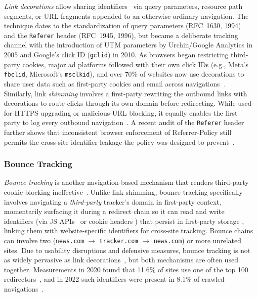 \textit{Link decorations} allow sharing identifiers \symSharing\ via query parameters, resource path segments, or URL fragments appended to an otherwise ordinary navigation.
%
The technique dates to the standardization of query parameters (RFC~1630, 1994) and the \texttt{Referer} header (RFC~1945, 1996), but became a deliberate tracking channel with the introduction of UTM parameters by Urchin/Google Analytics in 2005 and Google's click ID (\texttt{gclid}) in 2010.
%
As browsers began restricting third-party cookies, major ad platforms followed with their own click IDs (e.g., Meta's \texttt{fbclid}, Microsoft's \texttt{msclkid}), and over 70\% of websites now use decorations to share user data such as first-party cookies and email across navigations~\cite{munirPURLSafeEffective2024,koopInDepthEvaluationRedirect2020}.
%
Similarly, link \textit{shimming} involves a first-party rewriting the outbound links with decorations to route clicks through its own domain before redirecting.
%
While used for HTTPS upgrading or malicious-URL blocking, it equally enables the first party to log every outbound navigation~\cite{liShimShimmenyEvaluating2020}.
%
A recent audit of the \texttt{Referer} header further shows that inconsistent browser enforcement of Referrer-Policy still permits the cross-site identifier leakage the policy was designed to prevent~\cite{zagiReferrerPolicyImplementation2025}.


\subsubsection{Bounce Tracking}
\label{sec:stateful-techniques-bounce-tracking}

\textit{Bounce tracking} is another navigation-based mechanism that renders third-party cookie blocking ineffective~\cite{kellyBounceTrackingMitigations2022}.
%
Unlike link shimming, 
bounce tracking specifically involves navigating a \emph{third-party} tracker's domain in first-party context, momentarily surfacing it during a redirect chain so it can read and write identifiers (via JS APIs \symExecution\ or cookie headers \symSharing) that persist in first-party storage \symStorage, linking them with website-specific identifiers for cross-site tracking.
%
Bounce chains can involve two (\texttt{news.com} $\rightarrow$ \texttt{tracker.com} $\rightarrow$ \texttt{news.com}) or more unrelated sites.
%
Due to usability disruptions and defensive measures, bounce tracking is not as widely pervasive as link decorations~\cite{iqbalKhaleesiBreakerAdvertising2022}, but both mechanisms are often used together.
%
Measurements in 2020 found that 11.6\% of sites use one of the top 100 redirectors~\cite{koopInDepthEvaluationRedirect2020}, and in 2022 such identifiers were present in 8.1\% of crawled navigations~\cite{randallMeasuringUIDSmuggling2022}.


